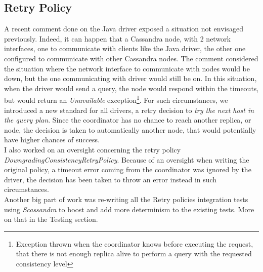 \documentclass[a4paper]{report}
\begin{document}
\subsection{Retry Policy}
A recent comment done on the Java driver exposed a situation not envisaged previously. Indeed, it can happen that a Cassandra node, with 2 network interfaces, one to communicate with clients like the Java driver, the other one configured to communicate with other Cassandra nodes. The comment considered the situation where the network interface to communicate with nodes would be down, but the one communicating with driver would still be on. In this situation, when the driver would send a query, the node would respond within the timeouts, but would return an \emph{Unavailable} exception\footnote{Exception thrown when the coordinator knows before executing the request, that there is not enough replica alive to perform a query with the requested consistency level}. For such circumstances, we introduced a new standard for all drivers, a retry decision to \emph{try the next host in the query plan}. Since the coordinator has no chance to reach another replica, or node, the decision is taken to automatically another node, that would potentially have higher chances of success.\\
I also worked on an oversight concerning the retry policy \emph{DowngradingConsistencyRetryPolicy}. Because of an oversight when writing the original policy, a timeout error coming from the coordinator was ignored by the driver, the decision has been taken to throw an error instead in such circumstances.\\
Another big part of work was re-writing all the Retry policies integration tests using \emph{Scassandra} to boost and add more determinism to the existing tests. More on that in the Testing section.
\end{document}
